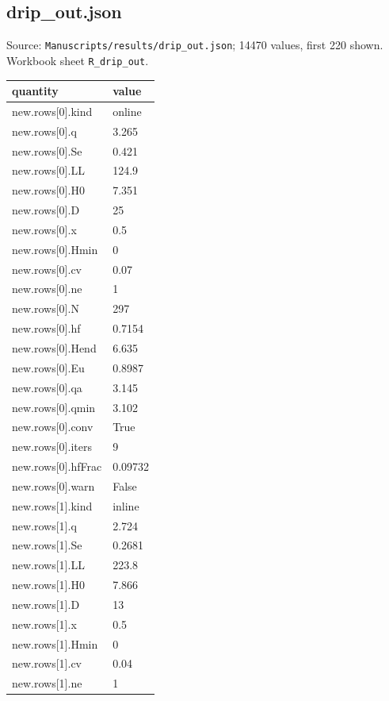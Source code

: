 \subsection*{drip\_out.json}
\noindent\small Source: \nolinkurl{Manuscripts/results/drip_out.json}; 14470 values, first 220 shown. Workbook sheet \texttt{R\_drip\_out}.\par
{\scriptsize\begin{longtable}{p{}p{}}\toprule\textbf{quantity} & \textbf{value}\\\midrule\endhead
{}new.rows[0].kind & online\\
{}new.rows[0].q & 3.265\\
{}new.rows[0].Se & 0.421\\
{}new.rows[0].LL & 124.9\\
{}new.rows[0].H0 & 7.351\\
{}new.rows[0].D & 25\\
{}new.rows[0].x & 0.5\\
{}new.rows[0].Hmin & 0\\
{}new.rows[0].cv & 0.07\\
{}new.rows[0].ne & 1\\
{}new.rows[0].N & 297\\
{}new.rows[0].hf & 0.7154\\
{}new.rows[0].Hend & 6.635\\
{}new.rows[0].Eu & 0.8987\\
{}new.rows[0].qa & 3.145\\
{}new.rows[0].qmin & 3.102\\
{}new.rows[0].conv & True\\
{}new.rows[0].iters & 9\\
{}new.rows[0].hfFrac & 0.09732\\
{}new.rows[0].warn & False\\
{}new.rows[1].kind & inline\\
{}new.rows[1].q & 2.724\\
{}new.rows[1].Se & 0.2681\\
{}new.rows[1].LL & 223.8\\
{}new.rows[1].H0 & 7.866\\
{}new.rows[1].D & 13\\
{}new.rows[1].x & 0.5\\
{}new.rows[1].Hmin & 0\\
{}new.rows[1].cv & 0.04\\
{}new.rows[1].ne & 1\\

\end{longtable}}
